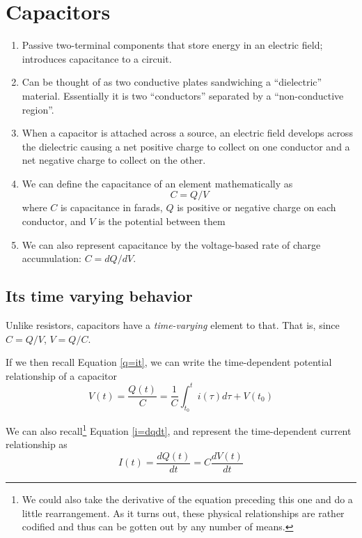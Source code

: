 \documentclass[11pt]{book}
\begin{document}
\section{Capacitors}
\begin{enumerate}
	\item Passive two-terminal components that store energy in an electric field; introduces capacitance to a circuit.
	\item Can be thought of as two conductive plates sandwiching a ``dielectric'' material. Essentially it is two ``conductors'' separated by a ``non-conductive region''.
	\item When a capacitor is attached across a source, an electric field develops across the dielectric causing a net positive charge to collect on one conductor and a net negative charge to collect on the other.
	\item We can define the capacitance of an element mathematically as 
	\begin{equation}
		C = Q/V
	\end{equation}
	where $C$ is capacitance in farads, $Q$ is positive or negative charge on each conductor, and $V$ is the potential between them
	\item We can also represent capacitance by the voltage-based rate of charge accumulation: $C = dQ/dV$.
\end{enumerate}

\subsection{Its time varying behavior}
Unlike resistors, capacitors have a \textit{time-varying} element to that. That is, since $C = Q/V$, $V = Q/C$.

If we then recall Equation \ref{q=it}, we can write the time-dependent potential relationship of a capacitor
\begin{equation}
	V(t) = \frac{Q(t)}{C} = \frac{1}{C}\int_{t_0}^{t} i(\tau) d\tau + V(t_0)
\end{equation}

We can also recall\footnote{We could also take the derivative of the equation preceding this one and do a little rearrangement. As it turns out, these physical relationships are rather codified and thus can be gotten out by any number of means.} Equation \ref{i=dqdt}, and represent the time-dependent current relationship as
\begin{equation}
	I(t) = \frac{dQ(t)}{dt} = C\frac{dV(t)}{dt}
\end{equation}
\end{document}
